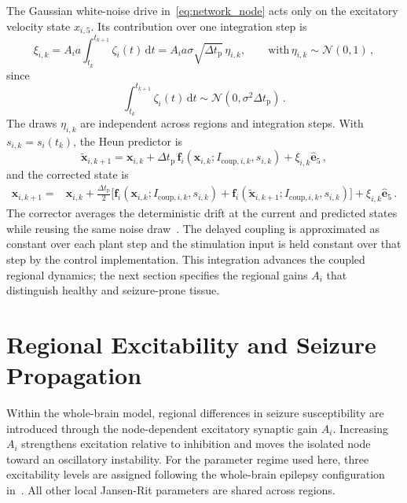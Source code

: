 The Gaussian white-noise drive in~\eqref{eq:network_node} acts only on the excitatory velocity state $x_{i,5}$.
Its contribution over one integration step is
%
\begin{equation*}
    \xi_{i,k}
    =A_i a\int_{t_k}^{t_{k+1}}\zeta_i(t)\,\mathrm{d}t
    =A_i a\sigma\sqrt{\Delta t_\mathrm{p}}\,\eta_{i,k},
    \qquad
    \text{with}\,\eta_{i,k}\sim\mathcal{N}(0, 1)\,,
\end{equation*}
%
since
%
\begin{equation*}
    \int_{t_k}^{t_{k+1}}\zeta_i(t)\,\mathrm{d}t
    \sim
    \mathcal{N}\!\left(0, \sigma^2\Delta t_\mathrm{p}\right)\,.
\end{equation*}
%
The draws $\eta_{i,k}$ are independent across regions and integration steps.
With $s_{i,k}=s_i(t_k)$, the Heun predictor is
%
\begin{equation*}
    \widetilde{\mathbf{x}}_{i,k+1}
    =\mathbf{x}_{i,k}
    +\Delta t_\mathrm{p}\,
      \mathbf{f}_i\!\left(\mathbf{x}_{i,k};I_{\mathrm{coup},i,k},s_{i,k}\right)
      +\xi_{i,k}\hat{\mathbf{e}}_5\,,
\end{equation*}
%
and the corrected state is
%
\begin{align*}
    \mathbf{x}_{i,k+1}
    ={}&\mathbf{x}_{i,k}
    +\frac{\Delta t_\mathrm{p}}{2}
      \Big[
      \mathbf{f}_i\!\left(\mathbf{x}_{i,k};I_{\mathrm{coup},i,k},s_{i,k}\right)
      +\mathbf{f}_i\!\left(\widetilde{\mathbf{x}}_{i,k+1};I_{\mathrm{coup},i,k},s_{i,k}\right)
      \Big]
      +\xi_{i,k}\hat{\mathbf{e}}_5\,.
\end{align*}
%
The corrector averages the deterministic drift at the current and predicted states while reusing the same noise draw~\cite{SanzLeon2015}.
The delayed coupling is approximated as constant over each plant step and the stimulation input is held constant over that step by the control implementation.
This integration advances the coupled regional dynamics; the next section specifies the regional gains $A_i$ that distinguish healthy and seizure-prone tissue.


\section{Regional Excitability and Seizure Propagation}
\label{sec:parameter_selection}

Within the whole-brain model, regional differences in seizure susceptibility are introduced through the node-dependent excitatory synaptic gain $A_i$.
Increasing $A_i$ strengthens excitation relative to inhibition and moves the isolated node toward an oscillatory instability.
For the parameter regime used here, three excitability levels are assigned following the whole-brain epilepsy configuration in~\cite{Yu2024}. %
All other local Jansen-Rit parameters are shared across regions.

